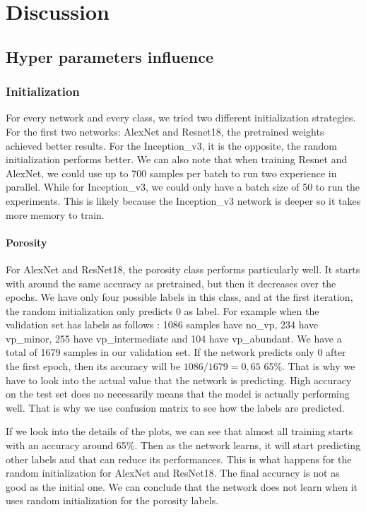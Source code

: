 \chapter{Discussion}\label{chp:discussion}
\section{Hyper parameters influence}
\subsection{Initialization}

For every network and every class, we tried two different initialization strategies. For the first two networks: AlexNet and Resnet18, the pretrained weights achieved better results. For the Inception\_v3, it is the opposite, the random initialization performs better. 
We can also note that when training Resnet and AlexNet, we could use up to 700 samples per batch to run two experience in parallel. While for Inception\_v3, we could only have a batch size of 50 to run the experiments. This is likely because the Inception\_v3  network is deeper so it takes more memory to train.


\subsubsection{Porosity}
For AlexNet and ResNet18, the porosity class performs particularly well. It starts with around the same accuracy as pretrained, but then it decreases over the epochs. We have only four possible labels in this class, and at the first iteration, the random initialization only predicts 0 as label. 
For example when the validation set has labels as follows : 1086 samples have no\_vp, 234 have vp\_minor, 255 have vp\_intermediate and 104 have vp\_abundant. We have a total of 1679 samples in our validation set. If the network predicts only 0 after the first epoch, then its accuracy will be \(1086/1679 = 0,65\) 65\%. That is why we have to look into the actual value that the network is predicting.  High accuracy on the test set does no necessarily means that the model is actually performing well. That is why we use confusion matrix to see how the labels are predicted.

If we look into the details of the plots, we can see that almost all training starts with an accuracy around 65\%. Then as the network learns, it will start predicting other labels and that can reduce its performances. This is what happens for the random initialization for AlexNet and ResNet18. The final accuracy is not as good as the initial one. We can conclude that the network does not learn when it uses random initialization for the porosity labels.

